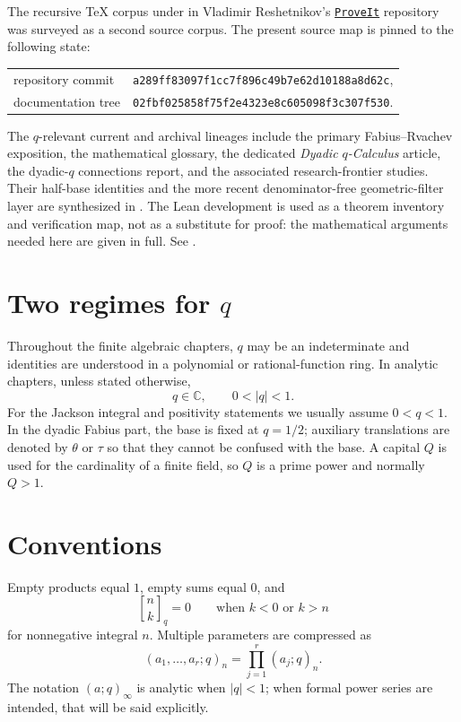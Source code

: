 \documentclass[11pt,oneside,openany]{book}
\theoremstyle{definition}
\theoremstyle{remark}
\newcommand{\qbinom}[2]{\genfrac{[}{]}{0pt}{}{#1}{#2}_{q}}
\newcommand{\C}{\mathbb C}
\newcommand{\abs}[1]{\lvert #1\rvert}
\begin{document}
The recursive \TeX{} corpus under
 in Vladimir Reshetnikov's
\href{https://github.com/VladimirReshetnikov/ProveIt}{\texttt{ProveIt}}
repository was surveyed as a second source corpus.  The present source map is
pinned to the following state:
\begin{center}
\small
\begin{tabular}{@{}ll@{}}
repository commit & \texttt{a289ff83097f1cc7f896c49b7e62d10188a8d62c},\\
documentation tree & \texttt{02fbf025858f75f2e4323e8c605098f3c307f530}.
\end{tabular}
\end{center}
The $q$-relevant current and archival lineages include the primary
Fabius--Rvachev exposition, the mathematical glossary, the dedicated
\emph{Dyadic $q$-Calculus} article, the dyadic-$q$ connections report, and the
associated research-frontier studies.  Their half-base identities and the
more recent denominator-free geometric-filter layer are synthesized in
.
The Lean development is used as a theorem inventory and verification map, not
as a substitute for proof: the mathematical arguments needed here are given
in full.  See \cite{ProveIt2026}.


\section*{Two regimes for $q$}
Throughout the finite algebraic chapters, $q$ may be an indeterminate and identities are understood in a polynomial or rational-function ring.  In analytic chapters, unless stated otherwise,
\[
  q\in\C,\qquad 0<\abs q<1.
\]
For the Jackson integral and positivity statements we usually assume $0<q<1$.  In the dyadic Fabius part, the base is fixed at $q=1/2$; auxiliary translations are denoted by $\theta$ or $\tau$ so that they cannot be confused with the base.  A capital $Q$ is used for the cardinality of a finite field, so $Q$ is a prime power and normally $Q>1$.

\section*{Conventions}
Empty products equal $1$, empty sums equal $0$, and
\[
 \qbinom nk=0\qquad\text{when }k<0\text{ or }k>n
\]
for nonnegative integral $n$.  Multiple parameters are compressed as
\[
 (a_1,\ldots,a_r;q)_n=\prod_{j=1}^r(a_j;q)_n.
\]
The notation $(a;q)_\infty$ is analytic when $\abs q<1$; when formal power series are intended, that will be said explicitly.
\end{document}
